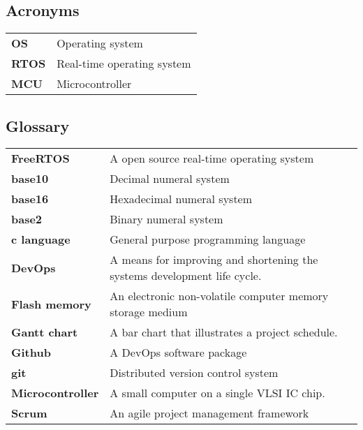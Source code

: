 \documentclass[../report.tex]{subfiles}
\begin{document}
\subsection{Acronyms}
\begin{table}[H]
    \begin{center}
        \begin{tabularx}{\linewidth}{l L}
            \textbf{OS} & Operating system\\
            \textbf{RTOS} & Real-time operating system\\
            \textbf{MCU} & Microcontroller\\
        \end{tabularx}
    \end{center}
\end{table}
\subsection{Glossary}
\begin{table}[H]
    \begin{center}
        \begin{tabularx}{\linewidth}{l L}
            \textbf{FreeRTOS} & A open source real-time operating system \\
            \textbf{base10} & Decimal numeral system \\
            \textbf{base16} & Hexadecimal numeral system \\
            \textbf{base2} & Binary numeral system \\
            \textbf{c language} & General purpose programming language \\
            \textbf{DevOps} & A means for improving and shortening the systems development life cycle. \\
            \textbf{Flash memory} & An electronic non-volatile computer memory storage medium \\
            \textbf{Gantt chart} & A bar chart that illustrates a project schedule. \\
            \textbf{Github} & A DevOps software package \\
            \textbf{git} & Distributed version control system \\
            \textbf{Microcontroller} & A small computer on a single VLSI IC chip. \\
            \textbf{Scrum} & An agile project management framework \\
        \end{tabularx}
    \end{center}
\end{table}
\end{document}
